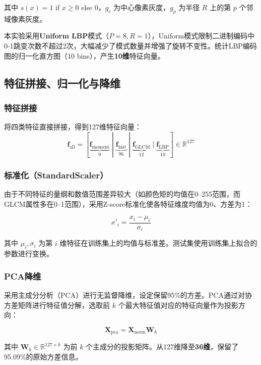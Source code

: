 \documentclass[12pt,a4paper]{ctexart}
\begin{document}
其中 $s(x) = 1$ if $x \geq 0$ else $0$，$g_c$ 为中心像素灰度，$g_p$ 为半径 $R$ 上的第 $p$ 个邻域像素灰度。

本实验采用\textbf{Uniform LBP}模式（$P=8, R=1$），Uniform模式限制二进制编码中0-1跳变次数不超过2次，大幅减少了模式数量并增强了旋转不变性。统计LBP编码图的归一化直方图（10 bins），产生\textbf{10维}特征向量。

\subsection{特征拼接、归一化与降维}

\subsubsection{特征拼接}
将四类特征直接拼接，得到127维特征向量：
\begin{equation}
    \mathbf{f}_{\text{all}} = [\underbrace{\mathbf{f}_{\text{moment}}}_{9} \;|\; \underbrace{\mathbf{f}_{\text{hist}}}_{96} \;|\; \underbrace{\mathbf{f}_{\text{GLCM}}}_{12} \;|\; \underbrace{\mathbf{f}_{\text{LBP}}}_{10}] \in \mathbb{R}^{127}
\end{equation}

\subsubsection{标准化（StandardScaler）}
由于不同特征的量纲和数值范围差异较大（如颜色矩的均值在0--255范围，而GLCM属性多在0--1范围），采用Z-score标准化使各特征维度均值为0、方差为1：

\begin{equation}
    x'_i = \frac{x_i - \mu_i}{\sigma_i}
\end{equation}

其中 $\mu_i, \sigma_i$ 为第 $i$ 维特征在训练集上的均值与标准差。测试集使用训练集上拟合的参数进行变换。

\subsubsection{PCA降维}
采用主成分分析（PCA）进行无监督降维，设定保留95\%的方差。PCA通过对协方差矩阵进行特征值分解，选取前 $k$ 个最大特征值对应的特征向量作为投影方向：

\begin{equation}
    \mathbf{X}_{\text{pca}} = \mathbf{X}_{\text{norm}} \mathbf{W}_k
\end{equation}

其中 $\mathbf{W}_k \in \mathbb{R}^{127 \times k}$ 为前 $k$ 个主成分的投影矩阵。从127维降至\textbf{36维}，保留了95.09\%的原始方差信息。
\end{document}
